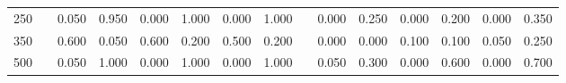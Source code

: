% 
\begin{tabular}{ccccccccccccccc}
  \hline
  \hline
250 &  & 0.050 & 0.950 & 0.000 & 1.000 & 0.000 & 1.000 &  & 0.000 & 0.250 & 0.000 & 0.200 & 0.000 & 0.350 \\ 
  350 &  & 0.600 & 0.050 & 0.600 & 0.200 & 0.500 & 0.200 &  & 0.000 & 0.000 & 0.100 & 0.100 & 0.050 & 0.250 \\ 
  500 &  & 0.050 & 1.000 & 0.000 & 1.000 & 0.000 & 1.000 &  & 0.050 & 0.300 & 0.000 & 0.600 & 0.000 & 0.700 \\ 
   \hline
\end{tabular}
